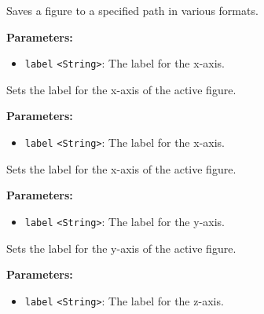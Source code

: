\documentclass[12pt,a4paper]{article}
\begin{document}
\noindent Saves a figure to a specified path in various formats.

\vspace{5mm}
\noindent {}


\noindent \textbf{Parameters:}
\begin{itemize}
  \item \texttt{label} \texttt{<String>}: The label for the x-axis.
\end{itemize}

\noindent Sets the label for the x-axis of the active figure.

\vspace{5mm}
\noindent {}


\noindent \textbf{Parameters:}
\begin{itemize}
  \item \texttt{label} \texttt{<String>}: The label for the x-axis.
\end{itemize}

\noindent Sets the label for the x-axis of the active figure.

\vspace{5mm}
\noindent {}


\noindent \textbf{Parameters:}
\begin{itemize}
  \item \texttt{label} \texttt{<String>}: The label for the y-axis.
\end{itemize}

\noindent Sets the label for the y-axis of the active figure.

\vspace{5mm}
\noindent {}


\noindent \textbf{Parameters:}
\begin{itemize}
  \item \texttt{label} \texttt{<String>}: The label for the z-axis.
\end{itemize}
\end{document}
